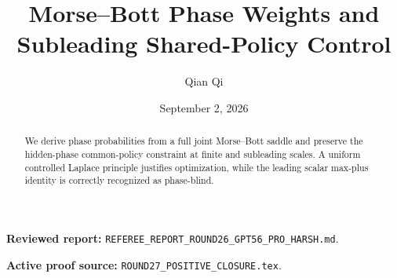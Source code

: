 \documentclass[11pt,reqno]{amsart}
\title[D1 Round 27 revision]{Morse--Bott Phase Weights and Subleading Shared-Policy Control}
\author{Qian Qi}
\date{September 2, 2026}
\begin{document}
\begin{abstract}We derive phase probabilities from a full joint Morse--Bott saddle and preserve the hidden-phase common-policy constraint at finite and subleading scales. A uniform controlled Laplace principle justifies optimization, while the leading scalar max-plus identity is correctly recognized as phase-blind.\end{abstract}
\maketitle
\noindent\textbf{Reviewed report:} \texttt{REFEREE\_REPORT\_ROUND26\_GPT56\_PRO\_HARSH.md}.\par
\noindent\textbf{Active proof source:} \texttt{ROUND27\_POSITIVE\_CLOSURE.tex}.\par

\end{document}
